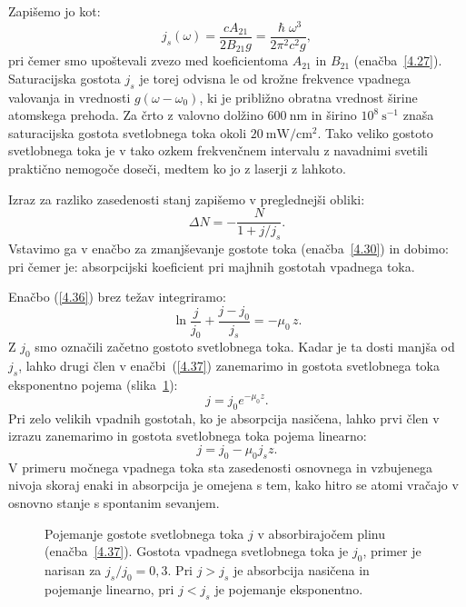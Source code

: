 Zapišemo jo kot:
\begin{equation}
j_{s}(\omega)=\frac{cA_{21}}{2B_{21}g}=
\frac{\hslash\omega^{3}}{2\pi^{2}c^{2}g},
\label{4.34}
\end{equation}
pri čemer smo upoštevali zvezo med koeficientoma $A_{21}$ in $B_{21}$
(enačba~\ref{4.27}).
Saturacijska gostota $j_s$ je torej odvisna le od krožne frekvence vpadnega valovanja 
in vrednosti $g(\omega-\omega_0)$, ki je približno obratna vrednost širine atomskega 
prehoda. Za črto z valovno dolžino $600~\si{\nano\metre}$ 
in širino $10^{8}~\si{\second}^{-1}$ znaša saturacijska gostota svetlobnega toka okoli 
$20~\si{\milli\watt/\centi\metre^2}$. Tako veliko gostoto svetlobnega toka je v tako ozkem
frekvenčnem intervalu z navadnimi svetili praktično nemogoče doseči, 
medtem ko jo z laserji z lahkoto.

Izraz za razliko zasedenosti stanj zapišemo v preglednejši obliki:
\begin{equation}
\Delta N=-\frac{N}{1+j/j_{s}}.
\label{4.35}
\end{equation}
Vstavimo ga v enačbo za zmanjševanje gostote toka (enačba~\ref{4.30}) in dobimo:
pri čemer je:
absorpcijski koeficient pri majhnih gostotah vpadnega toka.

Enačbo (\ref{4.36}) brez težav integriramo:
\begin{equation}
\ln\frac{j}{j_{0}}+\frac{j-j_{0}}{j_{s}}=-\mu_{0}\, z.
\label{4.37}
\end{equation}
Z $j_{0}$ smo označili začetno gostoto svetlobnega toka. Kadar je ta dosti
manjša od $j_{s}$, lahko drugi člen v enačbi~(\ref{4.37}) zanemarimo in gostota svetlobnega
toka eksponentno pojema (slika~\ref{fig:abs2}):
\begin{equation}
j = j_0 e^{-\mu_0 z}.
\end{equation}
Pri zelo velikih vpadnih gostotah, ko je absorpcija nasičena, lahko prvi člen v izrazu 
zanemarimo in gostota svetlobnega toka pojema linearno:
\begin{equation}
j=j_{0}-\mu_{0}j_{s}z.
\label{4.38}
\end{equation}
V primeru močnega vpadnega toka sta zasedenosti osnovnega in vzbujenega nivoja skoraj
enaki in absorpcija je omejena s tem, kako hitro se atomi vračajo
v osnovno stanje s spontanim sevanjem. 

\begin{figure}[ht]
\centering
\def\svgwidth{75truemm} 

\caption{Pojemanje gostote svetlobnega toka $j$ v absorbirajočem plinu (enačba~\ref{4.37}). 
Gostota vpadnega svetlobnega toka je $j_0$, primer je narisan za $j_s/j_0=0,3$. 
Pri $j>j_s$ je absorbcija nasičena in pojemanje linearno, 
pri $j<j_s$ je pojemanje eksponentno.}
\label{fig:abs2}
\end{figure}

